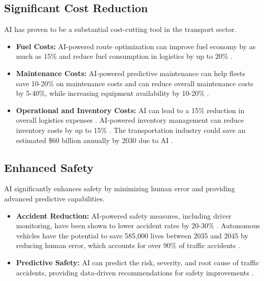 \subsection{Significant Cost Reduction}
AI has proven to be a substantial cost-cutting tool in the transport sector.
\begin{itemize}
    \item \textbf{Fuel Costs:} AI-powered route optimization can improve fuel economy by as much as 15\% and reduce fuel consumption in logistics by up to 20\% \cite{ArtSmart_Benefits}.
    \item \textbf{Maintenance Costs:} AI-powered predictive maintenance can help fleets save 10-20\% on maintenance costs \cite{Prismetric_Benefits} and can reduce overall maintenance costs by 5-40\%, while increasing equipment availability by 10-20\% \cite{MDPI_Benefits}.
    \item \textbf{Operational and Inventory Costs:} AI can lead to a 15\% reduction in overall logistics expenses \cite{ATSSA_Benefits}. AI-powered inventory management can reduce inventory costs by up to 15\% \cite{Evincedev_Benefits}. The transportation industry could save an estimated \$60 billion annually by 2030 due to AI \cite{ArtSmart_Benefits}.
\end{itemize}

\subsection{Enhanced Safety}
AI significantly enhances safety by minimizing human error and providing advanced predictive capabilities.
\begin{itemize}
    \item \textbf{Accident Reduction:} AI-powered safety measures, including driver monitoring, have been shown to lower accident rates by 20-30\% \cite{Prismetric_Benefits}. Autonomous vehicles have the potential to save 585,000 lives between 2035 and 2045 by reducing human error, which accounts for over 90\% of traffic accidents \cite{Medium_Benefits}.
    \item \textbf{Predictive Safety:} AI can predict the risk, severity, and root cause of traffic accidents, providing data-driven recommendations for safety improvements \cite{ATSSA_Benefits}.
\end{itemize}

